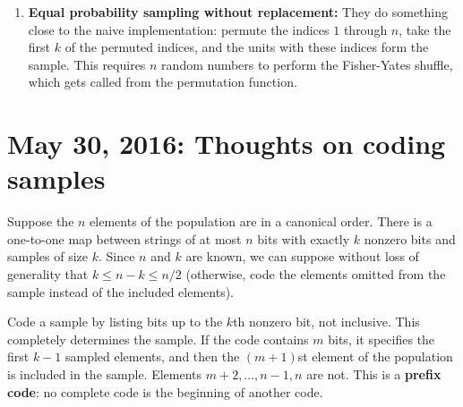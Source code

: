\documentclass[12pt]{article}
\begin{document}
\begin{itemize}
\begin{enumerate}
\begin{enumerate}
\item \textbf{Equal probability sampling without replacement:} 
They do something close to the naive implementation:
permute the indices $1$ through $n$,
take the first $k$ of the permuted indices,
and the units with these indices form the sample.
This requires $n$ random numbers to perform the Fisher-Yates shuffle, which gets called from the permutation function.
\end{enumerate}
\end{enumerate}

\end{itemize}



\section{May 30, 2016: Thoughts on coding samples}

Suppose the $n$ elements of the population are in a canonical order.
There is a one-to-one map between strings of at most $n$ bits with exactly $k$ nonzero bits
and samples of size $k$. 
Since $n$ and $k$ are known, we can suppose without loss of generality that $k \le n-k \le n/2$
(otherwise, code the elements omitted from the sample instead of the included elements).

Code a sample by listing bits up to the $k$th nonzero bit, not inclusive.
This completely determines the sample.
If the code contains $m$ bits, it specifies the first $k-1$ sampled elements, and then the $(m+1)$st element of the population is included in the sample.
Elements $m+2, \dots, n-1, n$ are not.
This is a \textbf{prefix code}: no complete code is the beginning of another code.
\end{document}
